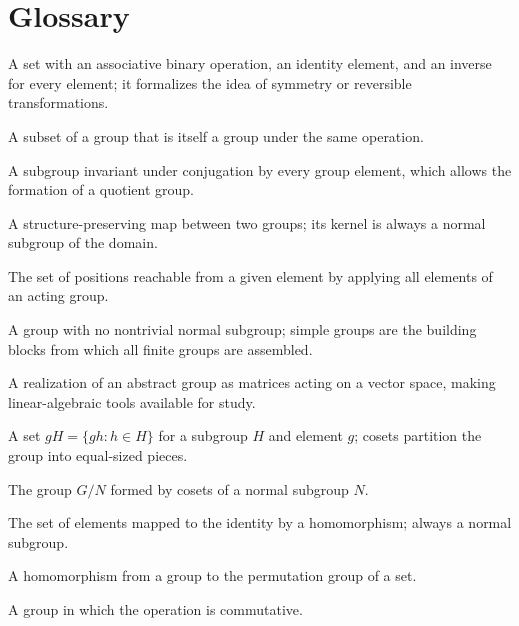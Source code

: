 \section*{Glossary}
\begin{description}[leftmargin=*,style=nextline,itemsep=0.3em]
\item[\textbf{Group.}] A set with an associative binary operation, an identity element, and an inverse for every element; it formalizes the idea of symmetry or reversible transformations.
\item[\textbf{Subgroup.}] A subset of a group that is itself a group under the same operation.
\item[\textbf{Normal subgroup.}] A subgroup invariant under conjugation by every group element, which allows the formation of a quotient group.
\item[\textbf{Homomorphism.}] A structure-preserving map between two groups; its kernel is always a normal subgroup of the domain.
\item[\textbf{Orbit.}] The set of positions reachable from a given element by applying all elements of an acting group.
\item[\textbf{Simple group.}] A group with no nontrivial normal subgroup; simple groups are the building blocks from which all finite groups are assembled.
\item[\textbf{Representation.}] A realization of an abstract group as matrices acting on a vector space, making linear-algebraic tools available for study.
\item[\textbf{Coset.}] A set $gH=\{gh:h\in H\}$ for a subgroup $H$ and element $g$; cosets partition the group into equal-sized pieces.
\item[\textbf{Quotient group.}] The group $G/N$ formed by cosets of a normal subgroup $N$.
\item[\textbf{Kernel.}] The set of elements mapped to the identity by a homomorphism; always a normal subgroup.
\item[\textbf{Group action.}] A homomorphism from a group to the permutation group of a set.
\item[\textbf{Abelian group.}] A group in which the operation is commutative.
\end{description}
